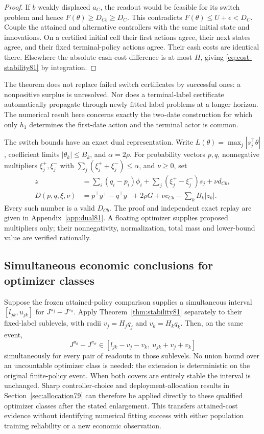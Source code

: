 \begin{proof}
If $b$ weakly displaced $a_C$, the readout would be feasible for its switch problem and hence $F(\theta)\ge D_{Cb}\ge D_C$. This contradicts $F(\theta)\le U+\epsilon<D_C$. Couple the attained and alternative controllers with the same initial state and innovations. On a certified initial cell their first actions agree, their next states agree, and their fixed terminal-policy actions agree. Their cash costs are identical there. Elsewhere the absolute cash-cost difference is at most $H$, giving \eqref{eq:cost-stability81} by integration.
\end{proof}

The theorem does not replace failed switch certificates by successful ones: a nonpositive surplus is unresolved. Nor does a terminal-label certificate automatically propagate through newly fitted label problems at a longer horizon. The numerical result here concerns exactly the two-date construction for which only $h_1$ determines the first-date action and the terminal actor is common.

The switch bounds have an exact dual representation. Write $L(\theta)=\max_j|s_j^\top\theta|$, coefficient limits $|\theta_k|\le B_k$, and $\alpha=2\rho$. For probability vectors $p,q$, nonnegative multipliers $\xi_j^+,\xi_j^-$ with $\sum_j(\xi_j^++\xi_j^-)\le\alpha$, and $\nu\ge0$, set
\begin{align}
 z&=\sum_i(q_i-p_i)\phi_i
       +\sum_j(\xi_j^+-\xi_j^-)s_j+\nu d_{Cb},\nonumber\\
 D(p,q,\xi,\nu)&=p^\top y^+-q^\top y^-+2\rho G
                        +\nu c_{Cb}-\sum_kB_k|z_k|.\label{eq:switch-dual81}
\end{align}
Every such number is a valid $D_{Cb}$. The proof and independent exact replay are given in Appendix~\ref{app:dual81}. A floating optimizer supplies proposed multipliers only; their nonnegativity, normalization, total mass and lower-bound value are verified rationally.

\subsection{Simultaneous economic conclusions for optimizer classes}
Suppose the frozen attained-policy comparison supplies a simultaneous interval $[l_{jk},u_{jk}]$ for $J^{\pi_j}-J^{\pi_k}$. Apply Theorem~\ref{thm:stability81} separately to their fixed-label sublevels, with radii $v_j=H_jq_j$ and $v_k=H_kq_k$. Then, on the same event,
\begin{equation}\label{eq:uniform-comparison81}
 J^{\pi_\theta}-J^{\pi_\vartheta}
       \in[l_{jk}-v_j-v_k,\ u_{jk}+v_j+v_k]
\end{equation}
simultaneously for every pair of readouts in those sublevels. No union bound over an uncountable optimizer class is needed: the extension is deterministic on the original finite-policy event. When both covers are entirely stable the interval is unchanged. Sharp controller-choice and deployment-allocation results in Section~\ref{sec:allocation79} can therefore be applied directly to these qualified optimizer classes after the stated enlargement. This transfers attained-cost evidence without identifying numerical fitting success with either population training reliability or a new economic observation.
